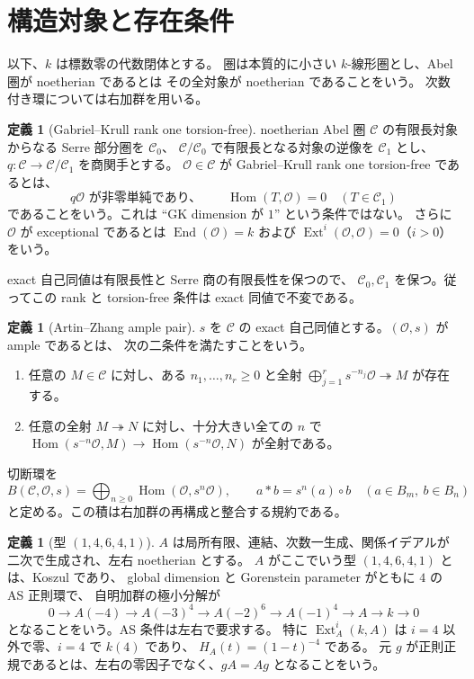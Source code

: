 \documentclass[a4paper,11pt]{ltjsarticle}
\numberwithin{equation}{section}
\theoremstyle{plain}
\theoremstyle{definition}
\newtheorem{definition}[theorem]{定義}
\theoremstyle{remark}
\newcommand{\OO}{\mathcal O}
\newcommand{\cC}{\mathcal C}
\DeclareMathOperator{\Hom}{Hom}
\DeclareMathOperator{\End}{End}
\DeclareMathOperator{\Ext}{Ext}
\begin{document}
\section{構造対象と存在条件}
\label{sec:definition}

以下、$k$ は標数零の代数閉体とする。
圏は本質的に小さい $k$-線形圏とし、Abel 圏が noetherian であるとは
その全対象が noetherian であることをいう。
次数付き環については右加群を用いる。

\begin{definition}[Gabriel--Krull rank one torsion-free]
\label{def:gk-rank}
noetherian Abel 圏 $\cC$ の有限長対象からなる Serre 部分圏を $\cC_0$、
$\cC/\cC_0$ で有限長となる対象の逆像を $\cC_1$ とし、
$q:\cC\to\cC/\cC_1$ を商関手とする。
$\OO\in\cC$ が Gabriel--Krull rank one torsion-free であるとは、
\[
 q\OO\text{ が非零単純であり、}\qquad
 \Hom(T,\OO)=0\quad(T\in\cC_1)
\]
であることをいう。これは ``GK dimension が $1$'' という条件ではない。
さらに $\OO$ が exceptional であるとは
$\End(\OO)=k$ および $\Ext^i(\OO,\OO)=0$（$i>0$）をいう。
\end{definition}

exact 自己同値は有限長性と Serre 商の有限長性を保つので、
$\cC_0,\cC_1$ を保つ。従ってこの rank と torsion-free 条件は exact 同値で不変である。

\begin{definition}[Artin--Zhang ample pair]
\label{def:ample}
$s$ を $\cC$ の exact 自己同値とする。$(\OO,s)$ が ample であるとは、
次の二条件を満たすことをいう。
\begin{enumerate}[label=(A\arabic*)]
\item 任意の $M\in\cC$ に対し、ある $n_1,\ldots,n_r\ge0$ と全射
      $\bigoplus_{j=1}^r s^{-n_j}\OO\twoheadrightarrow M$ が存在する。
\item 任意の全射 $M\twoheadrightarrow N$ に対し、十分大きい全ての $n$ で
      $\Hom(s^{-n}\OO,M)\to\Hom(s^{-n}\OO,N)$ が全射である。
\end{enumerate}
切断環を
\[
 B(\cC,\OO,s)=\bigoplus_{n\ge0}\Hom(\OO,s^n\OO),
 \qquad a*b=s^n(a)\circ b\quad(a\in B_m,\ b\in B_n)
\]
と定める。この積は右加群の再構成と整合する規約である。
\end{definition}

\begin{definition}[型 $(1,4,6,4,1)$]
\label{def:as14641}
$A$ は局所有限、連結、次数一生成、関係イデアルが二次で生成され、左右 noetherian とする。
$A$ がここでいう型 $(1,4,6,4,1)$ とは、Koszul であり、
global dimension と Gorenstein parameter がともに $4$ の AS 正則環で、
自明加群の極小分解が
\[
 0\to A(-4)\to A(-3)^4\to A(-2)^6\to A(-1)^4\to A\to k\to0
\]
となることをいう。AS 条件は左右で要求する。
特に $\Ext_A^i(k,A)$ は $i=4$ 以外で零、$i=4$ で $k(4)$ であり、
$H_A(t)=(1-t)^{-4}$ である。
元 $g$ が正則正規であるとは、左右の零因子でなく、$gA=Ag$ となることをいう。
\end{definition}
\end{document}
